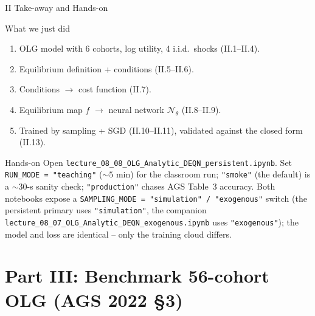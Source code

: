 \documentclass[aspectratio=169,11pt]{beamer}
\newcommand{\emphc}[1]{\textcolor{harvardcrimson}{#1}}
\newcommand{\N}{\mathcal{N}}
\begin{document}
\begin{frame}{II Take-away and Hands-on}
\footnotesize
\begin{block}{What we just did}
\begin{enumerate}\itemsep1pt
    \item OLG model with 6 cohorts, log utility, 4 i.i.d.\ shocks (II.1--II.4).
    \item Equilibrium definition + conditions (II.5--II.6).
    \item Conditions $\to$ \emphc{cost function} (II.7).
    \item Equilibrium map $f$ $\to$ neural network $\N_\theta$ (II.8--II.9).
    \item Trained by sampling + SGD (II.10--II.11), \emphc{validated} against the closed form (II.13).
\end{enumerate}
\end{block}

\begin{block}{Hands-on}
Open \texttt{lecture\_08\_08\_OLG\_Analytic\_DEQN\_persistent.ipynb}.  Set \texttt{RUN\_MODE = "teaching"} ($\sim 5$ min) for the classroom run; \texttt{"smoke"} (the default) is a $\sim$30-s sanity check; \texttt{"production"} chases AGS Table~3 accuracy.  Both notebooks expose a \texttt{SAMPLING\_MODE = "simulation" / "exogenous"} switch (the persistent primary uses \texttt{"simulation"}, the companion \texttt{lecture\_08\_07\_OLG\_Analytic\_DEQN\_exogenous.ipynb} uses \texttt{"exogenous"}); the model and loss are identical -- only the training cloud differs.
\end{block}
\end{frame}



\section{Part III: Benchmark 56-cohort OLG (AGS 2022 \S 3)}
\end{document}
